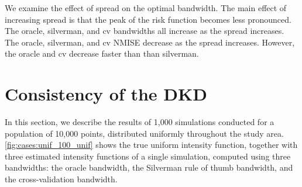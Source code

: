 We examine the effect of spread on the optimal bandwidth.
The main effect of increasing spread is that the peak of the risk function becomes less pronounced.
The \gls{oracle}, \gls{silverman}, and \gls{cv} bandwidths all increase as the spread increases.
The \gls{oracle}, \gls{silverman}, and \gls{cv} NMISE decrease as the spread increases.
However, the \gls{oracle} and \gls{cv} decrease faster than than \gls{silverman}.



\section{Consistency of the DKD}
\label{sec:results:consistency}


In this section, we describe the results of 1,000 simulations conducted for a population of 10,000 points,
distributed uniformly throughout the study area.
\autoref{fig:cases:unif_100_unif} shows the true uniform intensity function,
together with three estimated intensity functions of a single simulation,
computed using three bandwidths: the oracle bandwidth, the Silverman rule of thumb bandwidth,
and the cross-validation bandwidth.

